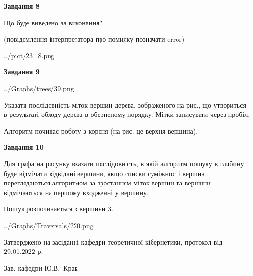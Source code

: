 \documentclass[12pt, ukrainian]{article}
\begin{document}
{\begin {large}
{\begin {center}\textbf{Завдання 8}\end {center}}\par
Що буде виведено за виконання?\par
 (повідомлення інтерпретатора про помилку позначати error)\par
\begin{center}
	{../pict/23_8.png}
\end{center}
\newpage

{\begin {center}\textbf{Завдання 9}\end {center}}\par

\begin{center}
	{../Graphs/trees/39.png}
\end{center}
Указати послідовність міток вершин дерева, зображеного на рис., що утвориться в результаті обходу дерева в оберненому порядку. Мітки записувати через пробіл.\par Алгоритм починає роботу з кореня (на рис. це верхня вершина).\par
\newpage

{\begin {center}\textbf{Завдання 10}\end {center}}\par
Для графа на рисунку вказати послідовність, в якій алгоритм пошуку в глибину буде відмічати відвідані вершини, якщо списки суміжності вершин переглядаються алгоритмом за зростанням міток вершин та вершини відмічаються на першому вход\-женні у вершину.\par
Пошук розпочинається з вершини 3.\par

\begin{center}
	{../Graphs/Traversals/220.png}
\end{center}\par
\newpage


\end {large}
}
{\smallskip \begin {small} Затверджено на засіданні кафедри теоретичної кібернетики, протокол  від   29.01.2022 р.\par\smallskip\smallskip
{\parbox {6.5 cm}{Зав. кафедри \dotfill Ю.В.~Крак}} \end{small}}
\end{document}
